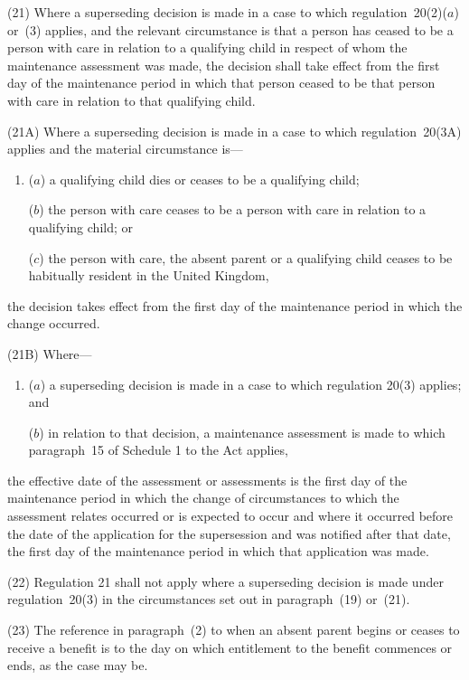 \documentclass[a4paper,12pt]{article}
\begin{document}
(21) Where a superseding decision is made in a case to which regulation~20(2)($a$)  or~(3) applies, and the relevant circumstance is that a person has ceased to be a person with care in relation to a qualifying child in respect of whom the maintenance assessment was made, the decision shall take effect from the first day of the maintenance period in which that person ceased to be that person with care in relation to that qualifying child.

(21A) Where a superseding decision is made in a case to which regulation~20(3A) applies and the material circumstance is—
\begin{enumerate}\item[]
($a$) a qualifying child dies or ceases to be a qualifying child;

($b$) the person with care ceases to be a person with care in relation to a qualifying child; or

($c$) the person with care, the absent parent or a qualifying child ceases to be habitually resident in the United Kingdom,
\end{enumerate}
the decision takes effect from the first day of the maintenance period in which the change occurred.

(21B) Where—
\begin{enumerate}\item[]
($a$) a superseding decision is made in a case to which regulation 20(3) applies; and

($b$) in relation to that decision, a maintenance assessment is made to which paragraph~15 of Schedule 1 to the Act applies,
\end{enumerate}
the effective date of the assessment or assessments is the first day of the maintenance period in which the change of circumstances to which the assessment relates occurred or is expected to occur and where it occurred before the date of the application for the supersession and was notified after that date, the first day of the maintenance period in which that application was made.

(22) Regulation 21 shall not apply where a superseding decision is made under regulation~20(3) in the circumstances set out in paragraph~(19) or~(21).

(23) The reference in paragraph~(2) to when an absent parent begins or ceases to receive a benefit is to the day on which entitlement to the benefit commences or ends, as the case may be.
\end{document}
